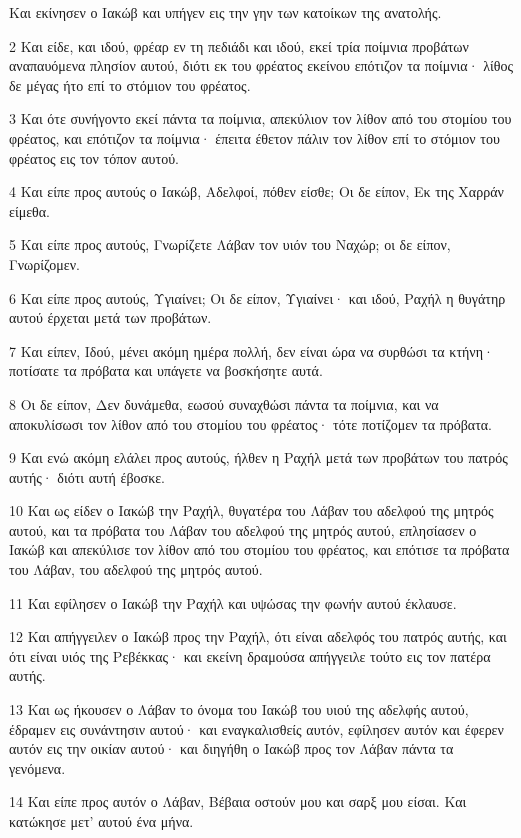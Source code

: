 \par Και εκίνησεν ο Ιακώβ και υπήγεν εις την γην των κατοίκων της ανατολής.
\par 2 Και είδε, και ιδού, φρέαρ εν τη πεδιάδι και ιδού, εκεί τρία ποίμνια προβάτων αναπαυόμενα πλησίον αυτού, διότι εκ του φρέατος εκείνου επότιζον τα ποίμνια· λίθος δε μέγας ήτο επί το στόμιον του φρέατος.
\par 3 Και ότε συνήγοντο εκεί πάντα τα ποίμνια, απεκύλιον τον λίθον από του στομίου του φρέατος, και επότιζον τα ποίμνια· έπειτα έθετον πάλιν τον λίθον επί το στόμιον του φρέατος εις τον τόπον αυτού.
\par 4 Και είπε προς αυτούς ο Ιακώβ, Αδελφοί, πόθεν είσθε; Οι δε είπον, Εκ της Χαρράν είμεθα.
\par 5 Και είπε προς αυτούς, Γνωρίζετε Λάβαν τον υιόν του Ναχώρ; οι δε είπον, Γνωρίζομεν.
\par 6 Και είπε προς αυτούς, Υγιαίνει; Οι δε είπον, Υγιαίνει· και ιδού, Ραχήλ η θυγάτηρ αυτού έρχεται μετά των προβάτων.
\par 7 Και είπεν, Ιδού, μένει ακόμη ημέρα πολλή, δεν είναι ώρα να συρθώσι τα κτήνη· ποτίσατε τα πρόβατα και υπάγετε να βοσκήσητε αυτά.
\par 8 Οι δε είπον, Δεν δυνάμεθα, εωσού συναχθώσι πάντα τα ποίμνια, και να αποκυλίσωσι τον λίθον από του στομίου του φρέατος· τότε ποτίζομεν τα πρόβατα.
\par 9 Και ενώ ακόμη ελάλει προς αυτούς, ήλθεν η Ραχήλ μετά των προβάτων του πατρός αυτής· διότι αυτή έβοσκε.
\par 10 Και ως είδεν ο Ιακώβ την Ραχήλ, θυγατέρα του Λάβαν του αδελφού της μητρός αυτού, και τα πρόβατα του Λάβαν του αδελφού της μητρός αυτού, επλησίασεν ο Ιακώβ και απεκύλισε τον λίθον από του στομίου του φρέατος, και επότισε τα πρόβατα του Λάβαν, του αδελφού της μητρός αυτού.
\par 11 Και εφίλησεν ο Ιακώβ την Ραχήλ και υψώσας την φωνήν αυτού έκλαυσε.
\par 12 Και απήγγειλεν ο Ιακώβ προς την Ραχήλ, ότι είναι αδελφός του πατρός αυτής, και ότι είναι υιός της Ρεβέκκας· και εκείνη δραμούσα απήγγειλε τούτο εις τον πατέρα αυτής.
\par 13 Και ως ήκουσεν ο Λάβαν το όνομα του Ιακώβ του υιού της αδελφής αυτού, έδραμεν εις συνάντησιν αυτού· και εναγκαλισθείς αυτόν, εφίλησεν αυτόν και έφερεν αυτόν εις την οικίαν αυτού· και διηγήθη ο Ιακώβ προς τον Λάβαν πάντα τα γενόμενα.
\par 14 Και είπε προς αυτόν ο Λάβαν, Βέβαια οστούν μου και σαρξ μου είσαι. Και κατώκησε μετ' αυτού ένα μήνα.
